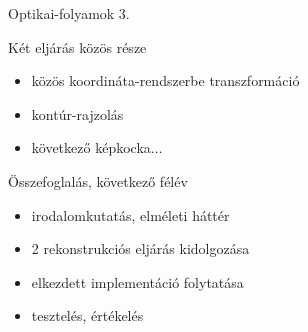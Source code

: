 \documentclass[17pt,xcolor=x11names]{beamer}
\begin{document}
\begin{frame}{Optikai-folyamok 3.}
\begin{center}
\end{center}
\end{frame}

\begin{frame}{Két eljárás közös része}
\begin{itemize}
\item közös koordináta-rendszerbe transzformáció
\item kontúr-rajzolás\\\vspace{30pt}
\item következő képkocka$\ldots$
\end{itemize}
\end{frame}

\begin{frame}{Összefoglalás, következő félév}
\begin{itemize}
\item irodalomkutatás, elméleti háttér
\item 2 rekonstrukciós eljárás kidolgozása\\\vspace{20pt}
\item elkezdett implementáció folytatása
\item tesztelés, értékelés
\end{itemize}
\end{frame}
\end{document}
